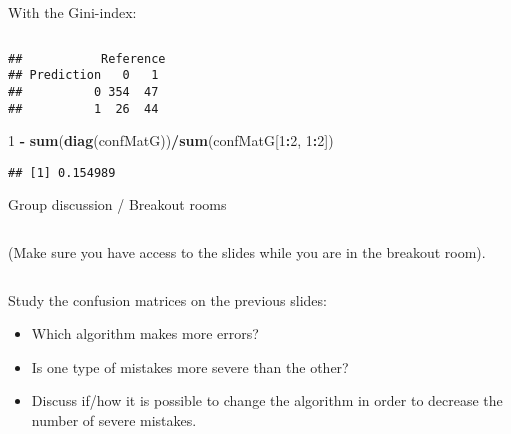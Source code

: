 \documentclass[10pt,ignorenonframetext,]{beamer}
\newenvironment{Shaded}{\begin{snugshade}}{\end{snugshade}}
\newcommand{\DataTypeTok}[1]{\textcolor[rgb]{0.13,0.29,0.53}{#1}}
\newcommand{\DecValTok}[1]{\textcolor[rgb]{0.00,0.00,0.81}{#1}}
\newcommand{\KeywordTok}[1]{\textcolor[rgb]{0.13,0.29,0.53}{\textbf{#1}}}
\newcommand{\NormalTok}[1]{#1}
\newcommand{\OperatorTok}[1]{\textcolor[rgb]{0.81,0.36,0.00}{\textbf{#1}}}
\newcommand{\StringTok}[1]{\textcolor[rgb]{0.31,0.60,0.02}{#1}}
\begin{document}
\begin{frame}[fragile]

\normalsize

With the Gini-index:

\(~\)

\tiny

\begin{Shaded}
\end{Shaded}

\begin{verbatim}
##           Reference
## Prediction   0   1
##          0 354  47
##          1  26  44
\end{verbatim}

\begin{Shaded}
\begin{Highlighting}[]
\DecValTok{1} \OperatorTok{-}\StringTok{ }\KeywordTok{sum}\NormalTok{(}\KeywordTok{diag}\NormalTok{(confMatG))}\OperatorTok{/}\KeywordTok{sum}\NormalTok{(confMatG[}\DecValTok{1}\OperatorTok{:}\DecValTok{2}\NormalTok{, }\DecValTok{1}\OperatorTok{:}\DecValTok{2}\NormalTok{])}
\end{Highlighting}
\end{Shaded}

\begin{verbatim}
## [1] 0.154989
\end{verbatim}

\end{frame}

\begin{frame}

\begin{block}{Group discussion / Breakout rooms}

\(~\)

(Make sure you have access to the slides while you are in the breakout
room).

\(~\)

Study the confusion matrices on the previous slides:

\begin{itemize}
\item
  Which algorithm makes more errors?
\item
  Is one type of mistakes more severe than the other?
\item
  Discuss if/how it is possible to change the algorithm in order to
  decrease the number of severe mistakes.
\end{itemize}

\end{block}

\end{frame}
\end{document}
